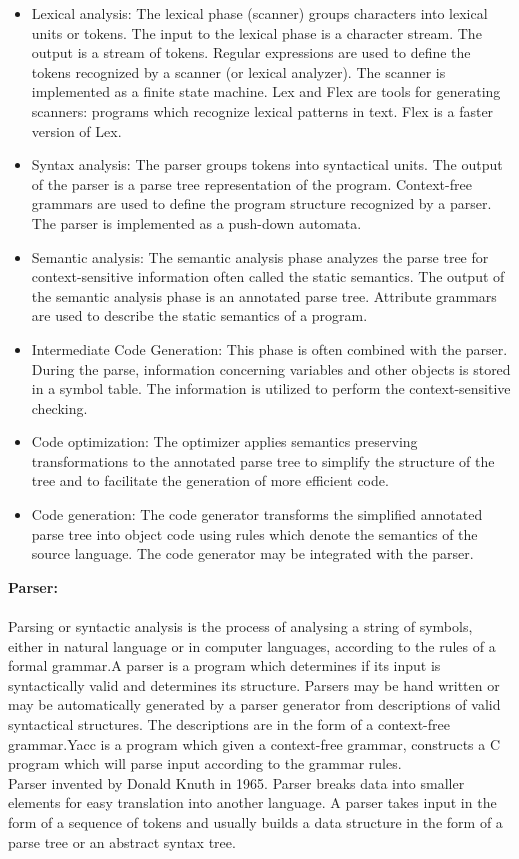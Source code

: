 \begin{itemize}
\item Lexical analysis: The lexical phase (scanner) groups characters into lexical units or tokens. The input to the lexical phase is a character stream. The output is a stream of tokens. Regular expressions are used to define the tokens recognized by a scanner (or lexical analyzer). The scanner is implemented as a finite state machine. Lex and Flex are tools for generating scanners: programs which recognize lexical patterns in text. Flex is a faster version of Lex.
\item Syntax analysis: The parser groups tokens into syntactical units. The output of the parser is a parse tree representation of the program. Context-free grammars are used to define the program structure recognized by a parser. The parser is implemented as a push-down automata.
\item Semantic analysis: The semantic analysis phase analyzes the parse tree for context-sensitive information often called the static semantics. The output of the semantic analysis phase is an annotated parse tree. Attribute grammars are used to describe the static semantics of a program.
\item Intermediate Code Generation: This phase is often combined with the parser. During the parse, information concerning variables and other objects is stored in a symbol table. The information is utilized to perform the context-sensitive checking.
\item Code optimization: The optimizer applies semantics preserving transformations to the annotated parse tree to simplify the structure of the tree and to facilitate the generation of more efficient code.
\item Code generation: The code generator transforms the simplified annotated parse tree into object code using rules which denote the semantics of the source language. The code generator may be integrated with the parser.
\end{itemize}
\textbf{Parser:}\\\\
Parsing or syntactic analysis is the process of analysing a string of symbols, either in natural language or in computer languages, according to the rules of a formal grammar.A parser is a program which determines if its input is syntactically valid and determines its structure. Parsers may be hand written or may be automatically generated by a parser generator from descriptions of valid syntactical structures. The descriptions are in the form of a context-free grammar.Yacc is a program which given a context-free grammar, constructs a C program which will parse input according to the grammar rules.\\
Parser invented by Donald Knuth in 1965. Parser breaks data into smaller elements for easy translation into another language. A parser takes input in the form of a sequence of tokens and usually builds a data structure in the form of a parse tree or an abstract syntax tree.\\\\

